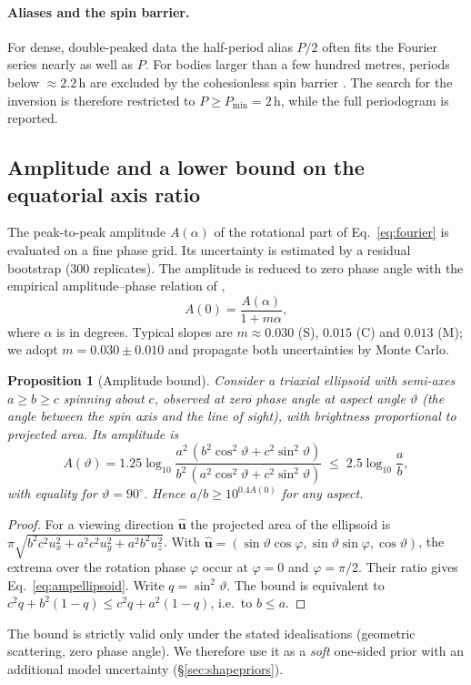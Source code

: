 \documentclass[11pt,a4paper]{article}
\newtheorem{proposition}{Proposition}
\theoremstyle{remark}
\newcommand{\uv}[1]{\hat{\bm{#1}}}
\begin{document}
\paragraph{Aliases and the spin barrier.} For dense, double-peaked data the half-period alias $P/2$
often fits the Fourier series nearly as well as $P$. For bodies larger than a few hundred metres,
periods below $\approx2.2$\,h are excluded by the cohesionless spin barrier \citep{pravec2000}. The
search for the inversion is therefore restricted to $P\ge P_{\min}=2$\,h, while the full periodogram is
reported.

\subsection{Amplitude and a lower bound on the equatorial axis ratio}
\label{sec:amp}
The peak-to-peak amplitude $A(\alpha)$ of the rotational part of Eq.~\eqref{eq:fourier} is evaluated on
a fine phase grid. Its uncertainty is estimated by a residual bootstrap (300 replicates). The amplitude
is reduced to zero phase angle with the empirical amplitude--phase relation of \citet{zappala1990},
\begin{equation}
  A(0) = \frac{A(\alpha)}{1+m\alpha},
  \label{eq:zappala}
\end{equation}
where $\alpha$ is in degrees. Typical slopes are $m\approx0.030$ (S), $0.015$ (C) and $0.013$ (M); we
adopt $m=0.030\pm0.010$ and propagate both uncertainties by Monte Carlo.

\begin{proposition}[Amplitude bound]
\label{prop:ab}
Consider a triaxial ellipsoid with semi-axes $a\ge b\ge c$ spinning about $c$, observed at zero phase
angle at aspect angle $\vartheta$ (the angle between the spin axis and the line of sight), with
brightness proportional to projected area. Its amplitude is
\begin{equation}
  A(\vartheta) = 1.25\log_{10}\frac{a^2\,(b^2\cos^2\vartheta + c^2\sin^2\vartheta)}
                                  {b^2\,(a^2\cos^2\vartheta + c^2\sin^2\vartheta)}
               \;\le\; 2.5\log_{10}\frac{a}{b},
  \label{eq:ampellipsoid}
\end{equation}
with equality for $\vartheta=90^\circ$. Hence $a/b\ge10^{0.4A(0)}$ for any aspect.
\end{proposition}
\begin{proof}
For a viewing direction $\uv u$ the projected area of the ellipsoid is
$\pi\sqrt{b^2c^2u_x^2+a^2c^2u_y^2+a^2b^2u_z^2}$. With
$\uv u=(\sin\vartheta\cos\varphi,\sin\vartheta\sin\varphi,\cos\vartheta)$, the extrema over the
rotation phase $\varphi$ occur at $\varphi=0$ and $\varphi=\pi/2$. Their ratio gives
Eq.~\eqref{eq:ampellipsoid}. Write $q=\sin^2\vartheta$. The bound is equivalent to
$c^2q+b^2(1-q)\le c^2q+a^2(1-q)$, i.e.\ to $b\le a$.
\end{proof}
The bound is strictly valid only under the stated idealisations (geometric scattering, zero phase
angle). We therefore use it as a \emph{soft} one-sided prior with an additional model uncertainty
(\S\ref{sec:shapepriors}).
\end{document}
